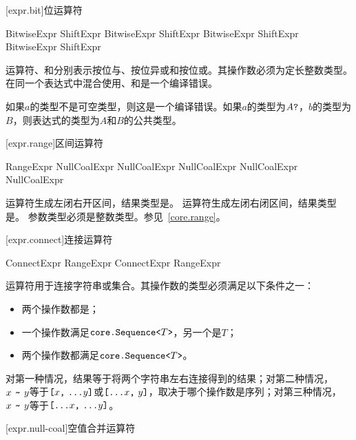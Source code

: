 [expr.bit]{位运算符}

\begin{bnf}{BitwiseExpr}
    ShiftExpr \br
    BitwiseExpr  ShiftExpr \br
    BitwiseExpr  ShiftExpr \br
    BitwiseExpr  ShiftExpr
\end{bnf}

\pnum
运算符、和分别表示按位与、按位异或和按位或。其操作数必须为定长整数类型。在同一个表达式中混合使用、和是一个编译错误。

\pnum
如果$a$的类型不是可空类型，则这是一个编译错误。如果$a$的类型为$A\texttt{?}$，$b$的类型为$B$，则表达式的类型为$A$和$B$的公共类型。

[expr.range]{区间运算符}

\begin{bnf}{RangeExpr}
    NullCoalExpr \br
    NullCoalExpr  NullCoalExpr \br
    NullCoalExpr  NullCoalExpr
\end{bnf}

\pnum
运算符生成左闭右开区间，结果类型是。
运算符生成左闭右闭区间，结果类型是。
参数类型必须是整数类型。参见~\ref{core.range}。

[expr.connect]{连接运算符}

\begin{bnf}{ConnectExpr}
    RangeExpr \br
    ConnectExpr \terminal{\~} RangeExpr
\end{bnf}

\pnum
运算符\tcode{\~}用于连接字符串或集合。其操作数的类型必须满足以下条件之一：

\begin{itemize}
    \item 两个操作数都是；
    \item 一个操作数满足$\texttt{core.Sequence<}T\texttt{>}$，另一个是$T$；
    \item 两个操作数都满足$\texttt{core.Sequence<}T\texttt{>}$。
\end{itemize}

对第一种情况，结果等于将两个字符串左右连接得到的结果；对第二种情况，$x\ \tcode{\~}\ y$等于$\tcode{[}x\tcode{,}\ \tcode{...}y\tcode{]}$或$\tcode{[...}x\tcode{,}\ y\tcode{]}$，取决于哪个操作数是序列；对第三种情况，$x\ \tcode{\~}\ y$等于$\tcode{[...}x\tcode{,}\ \tcode{...}y\tcode{]}$。

[expr.null-coal]{空值合并运算符}

